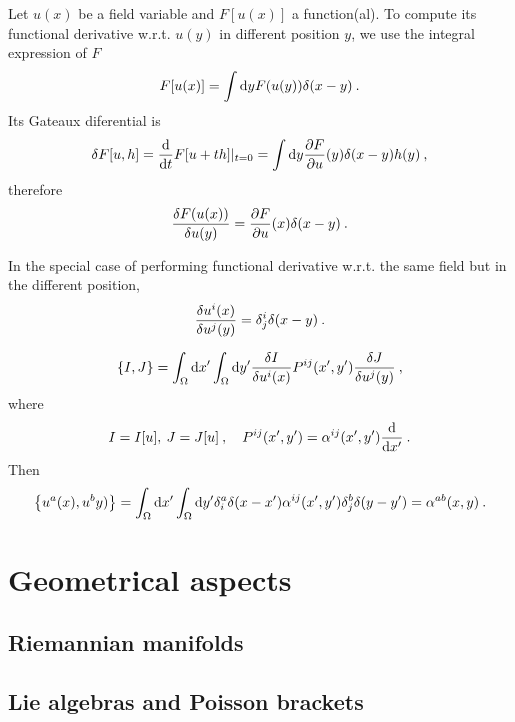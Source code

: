 \begin{example}
    Let $u(x)$ be a field variable and $F[u(x)]$ a function(al). 
    To compute its functional derivative w.r.t. $u(y)$ in different position $y$, we use the integral expression of $F$
    \begin{align}
        F[u(x)] = \int \mathrm{d} y F(u(y)) \delta (x-y) \:.
    \end{align}
    Its Gateaux diferential is
    \begin{align}
        \delta F[u,h] = \frac{\mathrm{d}}{\mathrm{d}t} F[u+th]|_{t=0} = \int \mathrm{d} y \frac{\partial F}{\partial u}(y) \delta(x-y) h(y) \:,
    \end{align}
    therefore
    \begin{align}
        \frac{\delta F(u(x))}{\delta u(y)} = \frac{\partial F}{\partial u}(x) \delta(x-y) \:.
    \end{align}
\end{example}

\begin{example}
    In the special case of performing functional derivative w.r.t. the same field but in the different position,
    \begin{align}
        \frac{\delta u^i(x)}{\delta u^j(y)} = \delta^i_j \delta(x-y) \:.   
    \end{align}
\end{example}

\begin{example}
    \begin{align}
        \left \lbrace I,J \right \rbrace = \int_\Omega \mathrm{d} x' \int_\Omega \mathrm{d} y' \frac{\delta I}{\delta u^i(x)} P^{ij}(x',y') \frac{\delta J}{\delta u^j(y)} \:,
    \end{align}
    where
    \begin{align}
        I = I[u], \: J = J[u] \:, \quad P^{ij}(x',y') = \alpha^{ij}(x',y') \frac{\mathrm{d}}{\mathrm{d}x'} \:.
    \end{align}
    Then
    \begin{align}
        \left \lbrace u^a(x),u^b y) \right \rbrace = \int_\Omega \mathrm{d} x' \int_\Omega \mathrm{d} y' \delta^a_i \delta(x-x') \alpha^{ij}(x',y') \delta^b_j \delta(y-y') = \alpha^{ab}(x,y) \:.
    \end{align}
\end{example}


\section{Geometrical aspects}
\subsection{Riemannian manifolds}
\subsection{Lie algebras and Poisson brackets}

